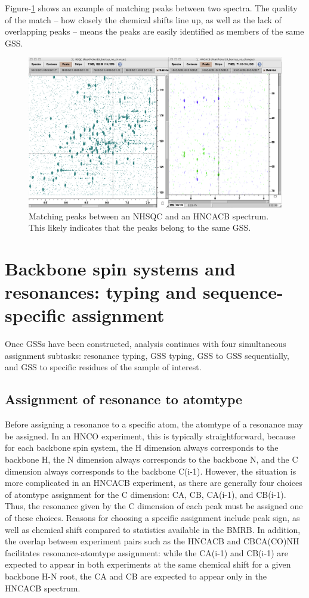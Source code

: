 Figure-\ref{nhsqc_hncacb} shows an example of matching peaks between two
spectra.  The quality of the match -- how closely the chemical shifts line up,
as well as the lack of overlapping peaks -- means the peaks are easily
identified as members of the same GSS.
\begin{figure}
  \includegraphics[scale=0.3]{figures/nhsqc_hncacb}
  \caption[Matching peaks between an NHSQC and an HNCACB spectrum]
          {Matching peaks between an NHSQC and an HNCACB spectrum.
           This likely indicates that the peaks belong to the same GSS.}
  \label{nhsqc_hncacb}
\end{figure}


\section{Backbone spin systems and resonances: typing and sequence-specific assignment}

Once GSSs have been constructed, analysis continues with four simultaneous 
assignment subtasks: resonance typing, GSS typing, GSS to
GSS sequentially, and GSS to specific residues of the sample of interest.

\subsection{Assignment of resonance to atomtype}

Before assigning a resonance to a specific 
atom, the atomtype of a resonance may be assigned.  In an HNCO experiment, 
this is typically straightforward, because for each backbone spin system, 
the H dimension always corresponds to the backbone H, the N dimension always 
corresponds to the backbone N, and the C dimension always corresponds to the 
backbone C(i-1).  However, the situation is more complicated in an HNCACB 
experiment, as there are generally four choices of atomtype assignment for 
the C dimension:  CA, CB, CA(i-1), and CB(i-1).  Thus, the resonance given 
by the C dimension of each peak must be assigned one of these choices.  
Reasons for choosing a specific assignment include peak sign, as well as 
chemical shift compared to statistics available in the BMRB.  In addition, 
the overlap between experiment pairs such as the HNCACB and CBCA(CO)NH 
facilitates resonance-atomtype assignment: while the CA(i-1) and CB(i-1) 
are expected to appear in both experiments at the same chemical shift for 
a given backbone H-N root, the CA and CB are expected to appear only in the 
HNCACB spectrum.

